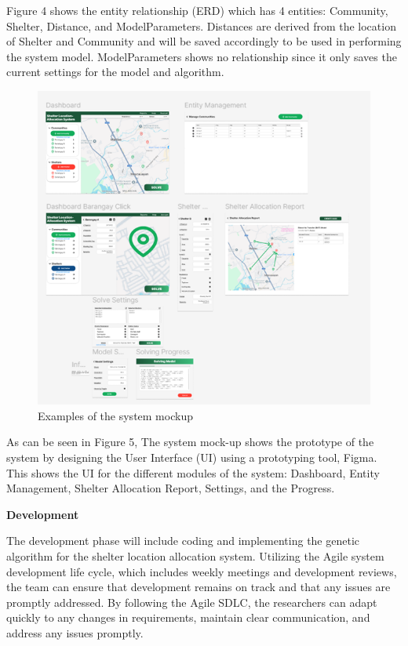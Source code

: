 Figure 4 shows the entity relationship (ERD) which has 4 entities: Community, Shelter, Distance, and ModelParameters. Distances are derived from the location of Shelter and Community and will be saved accordingly to be used in performing the system model. ModelParameters shows no relationship since it only saves the current settings for the model and algorithm.

\begin{figure}[h!]
	\caption{Examples of the system mockup}
	\centering
	\includegraphics[width=\textwidth]{SYSTEM MOCKUP}
\end{figure}

As can be seen in Figure 5, The system mock-up shows the prototype of the system by designing the User Interface (UI) using a prototyping tool, Figma. This shows the UI for the different modules of the system: Dashboard, Entity Management, Shelter Allocation Report, Settings, and the Progress.

\textbf{Development}

The development phase will include coding and implementing the genetic algorithm for the shelter location allocation system. Utilizing the Agile system development life cycle, which includes weekly meetings and development reviews, the team can ensure that development remains on track and that any issues are promptly addressed. By following the Agile SDLC, the researchers can adapt quickly to any changes in requirements, maintain clear communication, and address any issues promptly.

